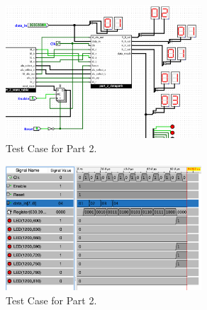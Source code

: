 \documentclass{article}
\begin{document}
\begin{enumerate}
    \begin{figure}[ht!]
    \centering
    \includegraphics[width=0.65\textwidth]{lab6_part3_testcases.png}
    \caption{Test Case for Part 2.}
    \label{f:part2_testcase 1}
\end{figure}
    \begin{figure}[ht!]
    \centering
    \includegraphics[width=0.65\textwidth]{lab6_part3_testcases1.png}
    \caption{Test Case for Part 2.}
    \label{f:part2_testcase 2}
\end{figure}

\end{enumerate}

\newpage
\end{document}
